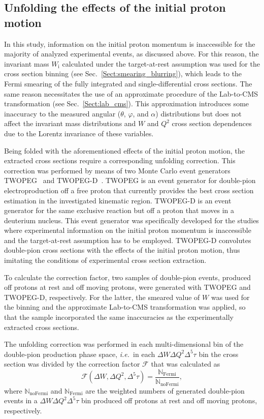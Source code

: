 \documentclass[prc,twocolumn,superscriptaddress,showpacs,amssymb,amsmath,amsfonts,aps,nofootinbib]{revtex4-1}
\begin{document}
\subsection{\!\!\!Unfolding the effects of\! the\! initial proton motion}
\label{Sect:fermi_corr}


In this study, information on the initial proton momentum is inaccessible for the majority of analyzed experimental events, as discussed above. For this reason, the invariant mass $W_{\textrm{i}}$ calculated under the target-at-rest assumption was used for the cross section binning (see Sec.\!~\ref{Sect:smearing_blurring}), which leads to the Fermi smearing of the fully integrated and single-differential cross sections. The same reason necessitates the use of an approximate procedure of the Lab-to-CMS transformation (see Sec.\!~\ref{Sect:lab_cms}). This approximation introduces some inaccuracy to the measured angular ($\theta$, $\varphi$, and $\alpha$) distributions but does not affect the invariant mass distributions and $W$ and $Q^{2}$ cross section dependences due to the Lorentz invariance of these variables. 


Being folded with the aforementioned effects of the initial proton motion, the extracted cross sections require a corresponding unfolding correction. This correction was performed by means of two Monte Carlo event generators TWOPEG~\cite{twopeg} and TWOPEG-D~\cite{twopeg-d}. TWOPEG is an event generator for double-pion electroproduction off a free proton that currently provides the best cross section estimation in the investigated kinematic region. TWOPEG-D is an event generator for the same exclusive reaction but off a proton that moves in a deuterium nucleus. This event generator was specifically developed for the studies where experimental information on the initial proton momentum is inaccessible and the target-at-rest assumption has to be employed. TWOPEG-D convolutes double-pion cross sections with the effects of the initial proton motion, thus imitating the conditions of experimental cross section extraction.

To calculate the correction factor, two samples of double-pion events, produced off protons at rest and off moving protons, were generated with TWOPEG and TWOPEG-D, respectively. For the latter, the smeared value of $W$ was used for the binning and the approximate Lab-to-CMS transformation was applied, so that the sample incorporated the same inaccuracies as the experimentally extracted cross sections.


The unfolding correction was performed in each multi-dimensional bin of the double-pion production phase space, {\it i.e.}~in each $\Delta W \Delta Q^{2}\Delta^{5}\tau$ bin the cross section was divided by the correction factor $\mathcal{F}$ that was calculated as
\begin{equation}
\mathcal{F}(\Delta W, \Delta Q^{2},\Delta^{5}\tau) = \frac{\mathbb{N}_{\text{Fermi}}}{\mathbb{N}_{\text{noFermi}}},
\label{eq:ferm_corr}
\end{equation}
where $\mathbb{N}_{\text{noFermi}}$ and $\mathbb{N}_{\text{Fermi}}$ are the weighted numbers of generated double-pion events in a $\Delta W \Delta Q^{2}\Delta^{5}\tau$ bin produced off protons at rest and off moving protons, respectively. 
\end{document}
